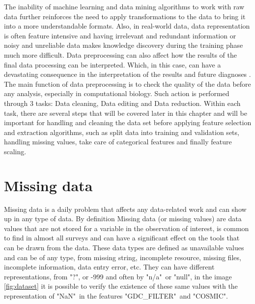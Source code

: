 The inability of machine learning and data mining algorithms to work with raw data further reinforces the need to apply transformations to the data to bring it into a more understandable formats. Also, in real-world data, data representation is often feature intensive and having irrelevant and redundant information or noisy and unreliable data makes knowledge discovery during the training phase much more difficult. Data preprocessing can also affect how the results of the final data processing can be interpreted. Which, in this case, can have a devastating consequence in the interpretation of the results and future diagnoses \cite{Paolo}. The main function of data preprocessing is to check the quality of the data before any analysis\cite{Pyle}, especially in computational biology. Such action is performed through 3 tasks: Data cleaning, Data editing and Data reduction. Within each task, there are several steps that will be covered later in this chapter and will be important for handling and cleaning the data set before applying feature selection and extraction algorithms, such as split data into training and validation sets, handling missing values, take care of categorical features and finally feature scaling.


\section{Missing data} %
\label{sec:missing_data}
\hspace{10px}Missing data is a daily problem that affects any data-related work and can show up in any type of data. By definition Missing data (or missing values) are data values that are not stored for a variable in the observation of interest, is common to find in almost all surveys and can have a significant effect on the tools that can be drawn from the data\cite{Graham}. These data types are defined as unavailable values and can be of any type, from missing string, incomplete resource, missing files, incomplete information, data entry error, etc. They can have different representations, from "?", or -999 and often by "n/a"\ or "null", in the image \ref{fig:dataset} it is possible to verify the existence of these same values with the representation of "NaN"\ in the features "GDC\_FILTER"\ and "COSMIC".

